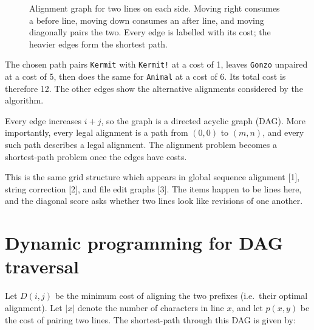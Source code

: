 \documentclass[
]{article}
\begin{document}
\begin{figure}[ht]
\caption{Alignment graph for two lines on each side. Moving right
consumes a before line, moving down consumes an after line, and moving
diagonally pairs the two. Every edge is labelled with its cost; the
heavier edges form the shortest path.}
\label{fig:simple-alignment-graph}
\end{figure}

The chosen path pairs \texttt{Kermit} with \texttt{Kermit!} at a cost of
1, leaves \texttt{Gonzo} unpaired at a cost of 5, then does the same for
\texttt{Animal} at a cost of 6. Its total cost is therefore 12. The
other edges show the alternative alignments considered by the algorithm.

Every edge increases \(i+j\), so the graph is a directed acyclic graph
(DAG). More importantly, every legal alignment is a path from \((0,0)\)
to \((m,n)\), and every such path describes a legal alignment. The
alignment problem becomes a shortest-path problem once the edges have
costs.

This is the same grid structure which appears in global sequence
alignment {[}1{]}, string correction {[}2{]}, and file edit graphs
{[}3{]}. The items happen to be lines here, and the diagonal score asks
whether two lines look like revisions of one another.

\hypertarget{dynamic-programming-for-dag-traversal}{%
\section{Dynamic programming for DAG
traversal}\label{dynamic-programming-for-dag-traversal}}

Let \(D(i,j)\) be the minimum cost of aligning the two prefixes
(i.e.~their optimal alignment). Let \(|x|\) denote the number of
characters in line \(x\), and let \(p(x,y)\) be the cost of pairing two
lines. The shortest-path through this DAG is given by:
\end{document}
